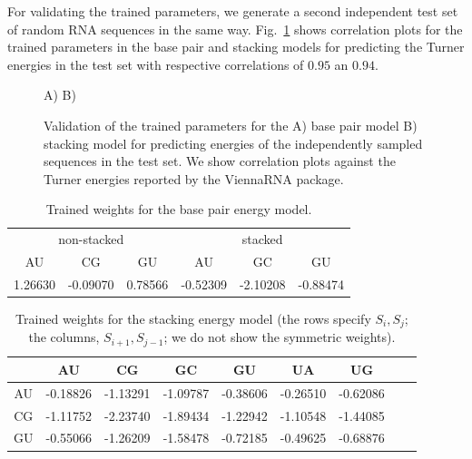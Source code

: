 \documentclass[10pt]{article}
\makeatletter
\newlength{\@aligneps}
\newcommand{\includegraphicstop}[2][]{%
\sbox{\@alignepsbox}{\texttt{[image: \#2]}}%
\setlength{\@aligneps}{-\ht\@alignepsbox}%
\addtolength{\@aligneps}{2ex}%
\raisebox{\@aligneps}{\usebox{\@alignepsbox}}}
\makeatother
\begin{document}
For validating the trained parameters, we generate a second
independent test set of random RNA sequences in the same
way. Fig.~\ref{fig:training-cor} shows correlation plots for the
trained parameters in the base pair and stacking models for predicting
the Turner energies in the test set with respective correlations of
$0.95$ an $0.94$.

\begin{figure}
  \centering
  A)\includegraphicstop[width=0.4\textwidth,trim=0 0 0 50,clip]{Figs/basepaircor}
  B)\includegraphicstop[width=0.4\textwidth,trim=0 0 0 50,clip]{Figs/stackingcor}
  \caption{Validation of the trained parameters for the A) base pair
    model B) stacking model for predicting energies of the
    independently sampled sequences in the test set. We show
    correlation plots against the Turner energies reported by the
    ViennaRNA package.}
  \label{fig:training-cor}
\end{figure}

\begin{table}[b]
  \centering
  \caption{Trained weights for the base pair energy model.}
  \label{tab:basepairmodel}
  \begin{tabular}{c@{\quad}c@{\quad}c@{\quad}|@{\quad}c@{\quad}c@{\quad}c}
    \multicolumn{3}{c}{non-stacked} & \multicolumn{3}{c}{stacked}\\
    AU      & CG       & GU      & AU       & GC       & GU \\\hline
    1.26630 & -0.09070 & 0.78566 & -0.52309 & -2.10208 & -0.88474
  \end{tabular}
\end{table}


\begin{table}[b]
  \centering
  \caption{Trained weights for the stacking energy model (the rows specify $S_i,S_j$; the columns, $S_{i+1},S_{j-1}$; we do not show the symmetric weights).}
  \label{tab:stackingmodel}
  \begin{tabular}{c@{\quad}|@{\quad}c@{\quad}c@{\quad}c@{\quad}c@{\quad}c@{\quad}c@{\quad}c@{\quad}c}
       & AU & CG & GC & GU & UA & UG \\\hline
    AU &
-0.18826 &
-1.13291 &
-1.09787 &
-0.38606 &
-0.26510 &
-0.62086
    \\
    CG &
-1.11752 &
-2.23740 &
-1.89434 &
-1.22942 &
-1.10548 &
-1.44085
    \\
    GU &
-0.55066 &
-1.26209 &
-1.58478 &
-0.72185 &
-0.49625 &
-0.68876
    \\
  \end{tabular}
\end{table}
\end{document}
